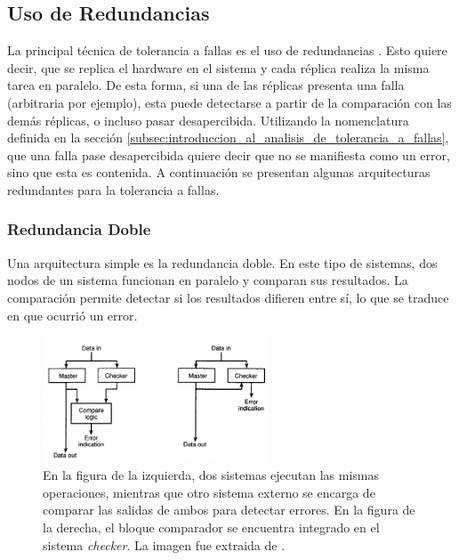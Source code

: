 \subsection{Uso de Redundancias}

La principal técnica de tolerancia a fallas es el uso de redundancias \cite{nelson1990fault}\cite{prasad1989fault}\cite{lala1994architectural}\cite{kopetz2003time}. Esto quiere decir, que se replica el hardware en el sistema y cada réplica realiza la misma tarea en paralelo. De esta forma, si una de las réplicas presenta una falla (arbitraria por ejemplo), esta puede detectarse a partir de la comparación con las demás réplicas, o incluso pasar desapercibida. Utilizando la nomenclatura definida en la sección \ref{subsec:introduccion_al_analisis_de_tolerancia_a_fallas}, que una falla pase desapercibida quiere decir que no se manifiesta como un error, sino que esta es contenida. A continuación se presentan algunas arquitecturas redundantes para la tolerancia a fallas.

\subsubsection*{Redundancia Doble}

Una arquitectura simple es la redundancia doble. En este tipo de sistemas, dos nodos de un sistema funcionan en paralelo y comparan sus resultados. La comparación permite detectar si los resultados difieren entre sí, lo que se traduce en que ocurrió un error.

\begin{figure}[H]
    \centering
    \includegraphics[width=0.6\textwidth]{img/3_4_lockstep_architecture.png}
    \caption{En la figura de la izquierda, dos sistemas ejecutan las mismas operaciones, mientras que otro sistema externo se encarga de comparar las salidas de ambos para detectar errores. En la figura de la derecha, el bloque comparador se encuentra integrado en el sistema \textit{checker}. La imagen fue extraida de \cite{nelson1990fault}.}
    \label{fig:3_4_lockstep_architecture}
\end{figure}

